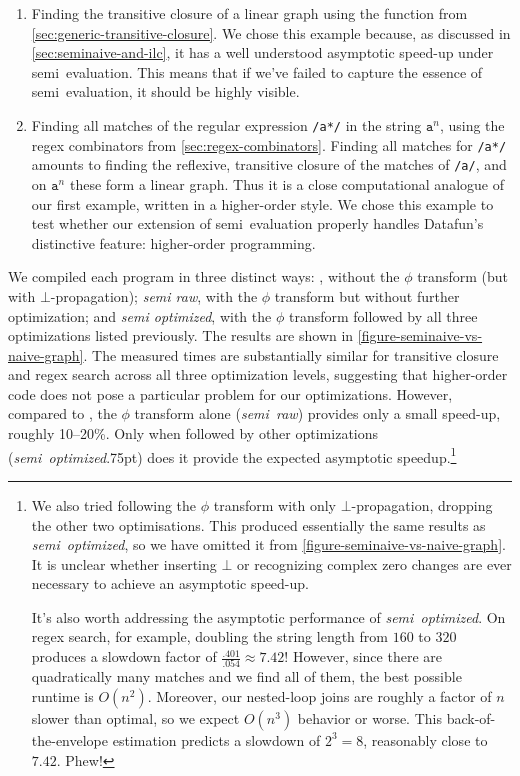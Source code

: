 \begin{enumerate}
\item Finding the transitive closure of a linear graph using the 
  function from \cref{sec:generic-transitive-closure}. We chose this example
  because, as discussed in \cref{sec:seminaive-and-ilc}, it has a well
  understood asymptotic speed-up under semi\naive\ evaluation. This means that
  if we've failed to capture the essence of semi\naive\ evaluation, it should be
  highly visible.

\item Finding all matches of the regular expression \texttt{/a*/} in the string
  $\texttt{a}^n$, using the regex combinators from \cref{sec:regex-combinators}.
  Finding all matches for \texttt{/a*/} amounts to finding the reflexive,
  transitive closure of the matches of \texttt{/a/}, and on $\texttt{a}^n$ these
  form a linear graph. Thus it is a close computational analogue of our first
  example, written in a higher-order style. We chose this example to test
  whether our extension of semi\naive\ evaluation properly handles Datafun's
  distinctive feature: higher-order programming.
\end{enumerate}

\noindent
We compiled each program in three distinct ways: \emph{\naive{}}, without the
$\phi$ transform (but with $\bot$-propagation); \emph{semi\naive{} raw}, with
the $\phi$ transform but without further optimization; and \emph{semi\naive{}
  optimized}, with the $\phi$ transform followed by all three optimizations
listed previously. The results are shown in
\cref{figure-seminaive-vs-naive-graph}.
%
The measured times are substantially similar for transitive closure and regex
search across all three optimization levels, suggesting that higher-order code
does not pose a particular problem for our optimizations. However, compared to
\emph{\naive}, the $\phi$ transform alone (\emph{semi\naive\ raw}) provides only
a small speed-up, roughly 10--20\%. Only when followed by other optimizations
(\emph{semi\naive\ optimized}\kern.75pt) does it provide the expected asymptotic
speedup.\footnote{We also tried following the $\phi$ transform with only
  $\bot$-propagation, dropping the other two optimisations. This produced
  essentially the same results as \emph{semi\naive\ optimized}, so we have
  omitted it from \cref{figure-seminaive-vs-naive-graph}. It is unclear whether
  inserting $\bot$ or recognizing complex zero changes are ever necessary to
  achieve an asymptotic speed-up.

  It's also worth addressing the asymptotic performance of
  \emph{semi\naive\ optimized}. On regex search, for example, doubling the string
  length from $160$ to $320$ produces a slowdown factor of $\frac{.401}{.054}
  \approx 7.42$! However, since there are quadratically many matches and we find
  all of them, the best possible runtime is $O(n^2)$. Moreover, our nested-loop
  joins are roughly a factor of $n$ slower than optimal, so we expect $O(n^3)$
  behavior or worse. This back-of-the-envelope estimation predicts a slowdown of
  $2^3 = 8$, reasonably close to $7.42$. Phew!}

